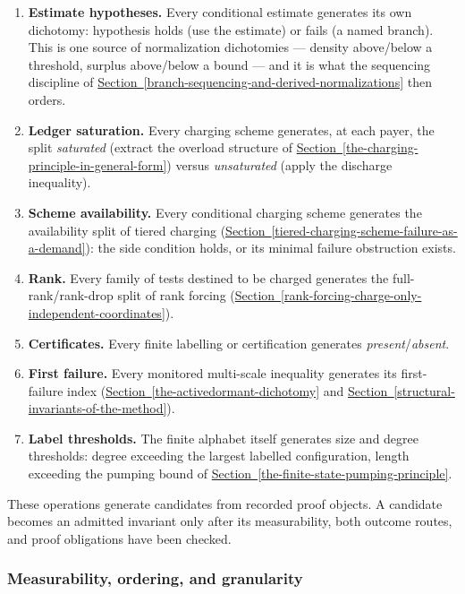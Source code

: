 \documentclass[
  11pt,
]{article}
\providecommand{\tightlist}{%
  \setlength{\itemsep}{0pt}\setlength{\parskip}{0pt}}
\theoremstyle{definition}
\newcommand{\secref}[1]{\hyperref[#1]{Section~\ref*{#1}}}
\begin{document}
\begin{enumerate}
\def\labelenumi{\arabic{enumi}.}
\tightlist
\item
  \textbf{Estimate hypotheses.} Every conditional estimate generates its
  own dichotomy: hypothesis holds (use the estimate) or fails (a named
  branch). This is one source of normalization dichotomies ---
  density above/below a threshold, surplus above/below a bound --- and
  it is what the sequencing discipline of \secref{branch-sequencing-and-derived-normalizations} then orders.
\item
  \textbf{Ledger saturation.} Every charging scheme generates, at each
  payer, the split \emph{saturated} (extract the overload structure of
  \secref{the-charging-principle-in-general-form}) versus \emph{unsaturated} (apply the discharge
  inequality).
\item
  \textbf{Scheme availability.} Every conditional charging scheme
  generates the availability split of tiered charging (\secref{tiered-charging-scheme-failure-as-a-demand}):
  the side condition holds, or its minimal failure obstruction exists.
\item
  \textbf{Rank.} Every family of tests destined to be charged generates
  the full-rank/rank-drop split of rank forcing (\secref{rank-forcing-charge-only-independent-coordinates}).
\item
  {\raggedright
  \textbf{Certificates.} Every finite labelling or certification
  generates \mbox{\emph{present}/\emph{absent}}.\par}
\item
  \textbf{First failure.} Every monitored multi-scale inequality
  generates its first-failure index (\secref{the-activedormant-dichotomy} and \secref{structural-invariants-of-the-method}).
\item
  \textbf{Label thresholds.} The finite alphabet itself generates size
  and degree thresholds: degree exceeding the largest labelled
  configuration, length exceeding the pumping bound of \secref{the-finite-state-pumping-principle}.
\end{enumerate}

These operations generate candidates from recorded proof objects. A
candidate becomes an admitted invariant only after its measurability,
both outcome routes, and proof obligations have been checked.



\subsubsection{Measurability, ordering, and
granularity}\label{measurability-ordering-and-granularity}
\end{document}
